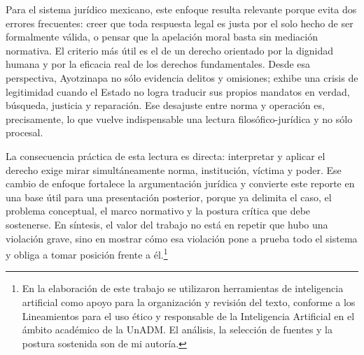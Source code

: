 \documentclass[
	spanish,
	letterpaper, oneside
]{article}
\begin{document}
Para el sistema jurídico mexicano, este enfoque resulta relevante porque evita dos errores frecuentes: creer que toda respuesta legal es justa por el solo hecho de ser formalmente válida, o pensar que la apelación moral basta sin mediación normativa. El criterio más útil es el de un derecho orientado por la dignidad humana y por la eficacia real de los derechos fundamentales. Desde esa perspectiva, Ayotzinapa no sólo evidencia delitos y omisiones; exhibe una crisis de legitimidad cuando el Estado no logra traducir sus propios mandatos en verdad, búsqueda, justicia y reparación. Ese desajuste entre norma y operación es, precisamente, lo que vuelve indispensable una lectura filosófico-jurídica y no sólo procesal.

La consecuencia práctica de esta lectura es directa: interpretar y aplicar el derecho exige mirar simultáneamente norma, institución, víctima y poder. Ese cambio de enfoque fortalece la argumentación jurídica y convierte este reporte en una base útil para una presentación posterior, porque ya delimita el caso, el problema conceptual, el marco normativo y la postura crítica que debe sostenerse. En síntesis, el valor del trabajo no está en repetir que hubo una violación grave, sino en mostrar cómo esa violación pone a prueba todo el sistema y obliga a tomar posición frente a él.\footnote{En la elaboración de este trabajo se utilizaron herramientas de inteligencia artificial como apoyo para la organización y revisión del texto, conforme a los Lineamientos para el uso ético y responsable de la Inteligencia Artificial en el ámbito académico de la UnADM. El análisis, la selección de fuentes y la postura sostenida son de mi autoría.}

%

% 
\end{document}
